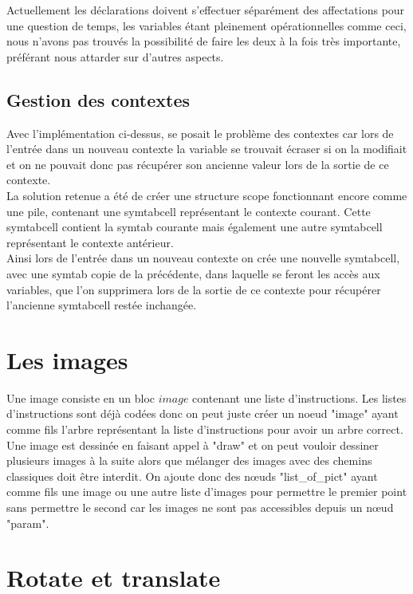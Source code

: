 \documentclass[a4paper,titlepage]{article}
\begin{document}
Actuellement les déclarations doivent s'effectuer séparément des affectations pour une question de temps, les variables étant pleinement opérationnelles comme ceci, nous n'avons pas trouvés la possibilité de faire les deux à la fois très importante, préférant nous attarder sur d'autres aspects.

\subsection{Gestion des contextes}

Avec l'implémentation ci-dessus, se posait le problème des contextes car lors de l'entrée dans un nouveau contexte la variable se trouvait écraser si on la modifiait et on ne pouvait donc pas récupérer son ancienne valeur lors de la sortie de ce contexte.\\
La solution retenue a été de créer une structure scope fonctionnant encore comme une pile, contenant une symtabcell représentant le contexte courant. Cette symtabcell contient la symtab courante mais également une autre symtabcell représentant le contexte antérieur.\\
Ainsi lors de l'entrée dans un nouveau contexte on crée une nouvelle symtabcell, avec une symtab copie de la précédente, dans laquelle se feront les accès aux variables, que l'on supprimera lors de la sortie de ce contexte pour récupérer l'ancienne symtabcell restée inchangée.

\newpage
\section{Les images}

Une image consiste en un bloc $image{ }$ contenant une liste d'instructions. Les listes d'instructions sont déjà codées donc on peut juste créer un noeud "image" ayant comme fils l'arbre représentant la liste d'instructions pour avoir un arbre correct.\\
Une image est dessinée en faisant appel à "draw" et on peut vouloir dessiner plusieurs images à la suite alors que mélanger des images avec des chemins classiques doit être interdit. On ajoute donc des nœuds "list\_of\_pict" ayant comme fils une image ou une autre liste d'images pour permettre le premier point sans permettre le second car les images ne sont pas accessibles depuis un nœud "param".

\vspace{2cm}
\section{Rotate et translate}
\end{document}
